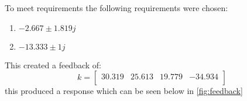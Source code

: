 To meet requirements the following requirements were chosen: \begin{enumerate}
\item$-2.667 \pm 1.819j$\\
\item$-13.333 \pm 1j$\end{enumerate}
This created a feedback of: 
\begin{equation}k = \begin{bmatrix}
30.319&25.613&19.779&-34.934\\
\end{bmatrix}
\end{equation}this produced a response which can be seen below in \autoref{fig:feedback}
